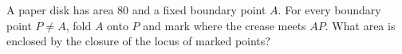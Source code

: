 A paper disk has area $80$ and a fixed boundary point $A$. For every boundary point $P\ne A$, fold $A$ onto $P$ and mark where the crease meets $AP$. What area is enclosed by the closure of the locus of marked points?
